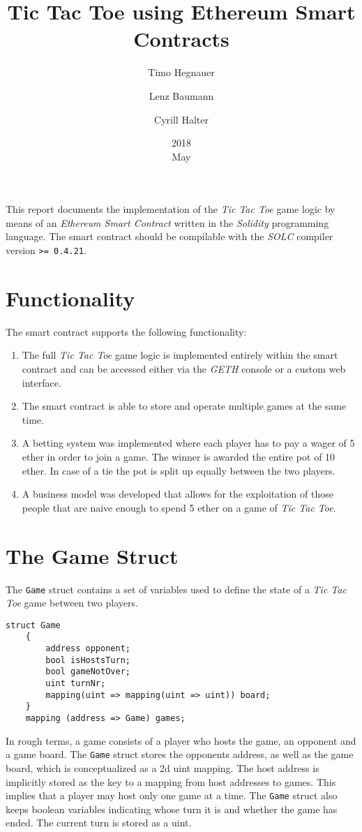 \documentclass[10pt]{article}
\title{Tic Tac Toe using Ethereum Smart Contracts}
\date{2018\\ May}
\author{Timo Hegnauer
\and Lenz Baumann
\and Cyrill Halter}
\begin{document}
\maketitle
This report documents the implementation of the \emph{Tic Tac Toe} game logic by means of an \emph{Ethereum Smart Contract} written in the \emph{Solidity} programming language. The smart contract should be compilable with the \emph{SOLC} compiler version \texttt{>= 0.4.21}.

\section{Functionality}
The smart contract supports the following functionality:
\begin{enumerate}
	\item The full \emph{Tic Tac Toe} game logic is implemented entirely within the smart contract and can be accessed either via the \emph{GETH} console or a custom web interface.
	\item The smart contract is able to store and operate multiple games at the same time.
	\item A betting system was implemented where each player has to pay a wager of 5 ether in order to join a game. The winner is awarded the entire pot of 10 ether. In case of a tie the pot is split up equally between the two players.
	\item A business model was developed that allows for the exploitation of those people that are naive enough to spend 5 ether on a game of \emph{Tic Tac Toe}.
\end{enumerate}

\section{The Game Struct}

The \texttt{Game} struct contains a set of variables used to define the state of a \emph{Tic Tac Toe} game between two players.

\begin{Verbatim}[fontsize=\small]
    struct Game
    {
        address opponent;
        bool isHostsTurn;
        bool gameNotOver;
        uint turnNr;
        mapping(uint => mapping(uint => uint)) board;
    }
    mapping (address => Game) games;
\end{Verbatim}

In rough terms, a game consists of a player who hosts the game, an opponent and a game board. The \texttt{Game} struct stores the opponents address, as well as the game board, which is conceptualized as a 2d uint mapping. The host address is implicitly stored as the key to a mapping from host addresses to games. This implies that a player may host only one game at a time. The \texttt{Game} struct also keeps boolean variables indicating whose turn it is and whether the	 game has ended. The current turn is stored as a uint.
\end{document}
